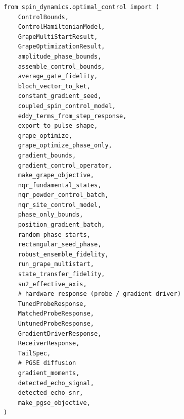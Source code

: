 \documentclass[11pt,oneside]{report}
\begin{document}
\begin{lstlisting}
from spin_dynamics.optimal_control import (
    ControlBounds,
    ControlHamiltonianModel,
    GrapeMultiStartResult,
    GrapeOptimizationResult,
    amplitude_phase_bounds,
    assemble_control_bounds,
    average_gate_fidelity,
    bloch_vector_to_ket,
    constant_gradient_seed,
    coupled_spin_control_model,
    eddy_terms_from_step_response,
    export_to_pulse_shape,
    grape_optimize,
    grape_optimize_phase_only,
    gradient_bounds,
    gradient_control_operator,
    make_grape_objective,
    nqr_fundamental_states,
    nqr_powder_control_batch,
    nqr_site_control_model,
    phase_only_bounds,
    position_gradient_batch,
    random_phase_starts,
    rectangular_seed_phase,
    robust_ensemble_fidelity,
    run_grape_multistart,
    state_transfer_fidelity,
    su2_effective_axis,
    # hardware response (probe / gradient driver)
    TunedProbeResponse,
    MatchedProbeResponse,
    UntunedProbeResponse,
    GradientDriverResponse,
    ReceiverResponse,
    TailSpec,
    # PGSE diffusion
    gradient_moments,
    detected_echo_signal,
    detected_echo_snr,
    make_pgse_objective,
)
\end{lstlisting}
\end{document}
